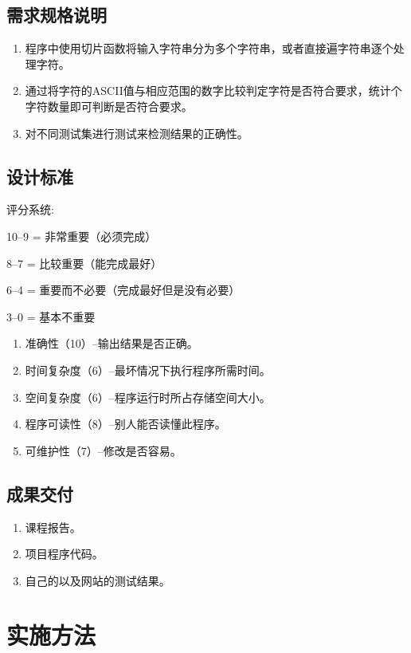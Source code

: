 \begin{spacing}{1.5}
    \subsection{需求规格说明}
    \begin{enumerate} [\indent 1、]
        \item 程序中使用切片函数将输入字符串分为多个字符串，或者直接遍字符串逐个处理字符。
        \item 通过将字符的ASCII值与相应范围的数字比较判定字符是否符合要求，统计个字符数量即可判断是否符合要求。
        \item 对不同测试集进行测试来检测结果的正确性。
    \end{enumerate}
    
    \subsection{设计标准}
    评分系统:

    10--9 = 非常重要（必须完成）
    
    8--7 = 比较重要（能完成最好）
    
    6--4 = 重要而不必要（完成最好但是没有必要）
    
    3--0 = 基本不重要

    \begin{enumerate} [\indent 1、]
        \item 准确性（10）--输出结果是否正确。
        \item 时间复杂度（6）--最坏情况下执行程序所需时间。
        \item 空间复杂度（6）--程序运行时所占存储空间大小。
        \item 程序可读性（8）--别人能否读懂此程序。
        \item 可维护性（7）--修改是否容易。
    \end{enumerate}

    \subsection{成果交付}
    \begin{enumerate} [\indent 1、]
        \item 课程报告。
        \item 项目程序代码。
        \item 自己的以及网站的测试结果。
    \end{enumerate}
    \section{实施方法}

\end{spacing}
